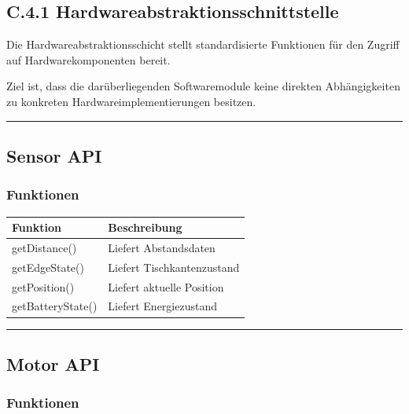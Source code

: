 \documentclass[
  a4paper,
  12pt,
  DIV=12,        %
  parskip=half,  %
  headings=small %
]{scrartcl}
\theoremstyle{definition}
\theoremstyle{definition}
\begin{document}
\subsection{C.4.1
Hardwareabstraktionsschnittstelle}\label{c.4.1-hardwareabstraktionsschnittstelle}

Die Hardwareabstraktionsschicht stellt standardisierte Funktionen für
den Zugriff auf Hardwarekomponenten bereit.

Ziel ist, dass die darüberliegenden Softwaremodule keine direkten
Abhängigkeiten zu konkreten Hardwareimplementierungen besitzen.

\begin{center}\rule{0.5\linewidth}{0.5pt}\end{center}

\subsection{Sensor API}\label{sensor-api}

\subsubsection{Funktionen}\label{funktionen-5}

\begin{longtable}[]{@{}ll@{}}
\toprule\noalign{}
Funktion & Beschreibung \\
\midrule\noalign{}
\endhead
\bottomrule\noalign{}
\endlastfoot
getDistance() & Liefert Abstandsdaten \\
getEdgeState() & Liefert Tischkantenzustand \\
getPosition() & Liefert aktuelle Position \\
getBatteryState() & Liefert Energiezustand \\
\end{longtable}

\begin{center}\rule{0.5\linewidth}{0.5pt}\end{center}

\subsection{Motor API}\label{motor-api}

\subsubsection{Funktionen}\label{funktionen-6}
\end{document}
